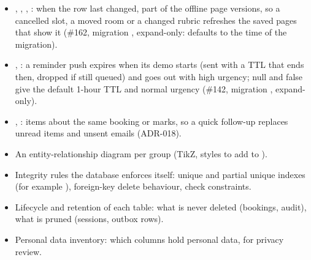 \begin{itemize}
  \item {}, , , : when the row last changed, part of the offline page versions, so a cancelled slot, a moved room or a changed rubric refreshes the saved pages that show it (\#162, migration , expand-only: defaults to the time of the migration).
  \item {}, : a reminder push expires when its demo starts (sent with a TTL that ends then, dropped if still queued) and goes out with high urgency; null and false give the default 1-hour TTL and normal urgency (\#142, migration , expand-only).
  \item {}, : items about the same booking or marks, so a quick follow-up replaces unread items and unsent emails (ADR-018).
\end{itemize}

\begin{todo}
  \begin{itemize}
    \item An entity-relationship diagram per group (TikZ,  styles to add to
      ).
    \item Integrity rules the database enforces itself: unique and partial unique indexes (for
      example ), foreign-key delete behaviour, check constraints.
    \item Lifecycle and retention of each table: what is never deleted (bookings, audit), what is
      pruned (sessions, outbox rows).
    \item Personal data inventory: which columns hold personal data, for privacy review.
  \end{itemize}
\end{todo}
